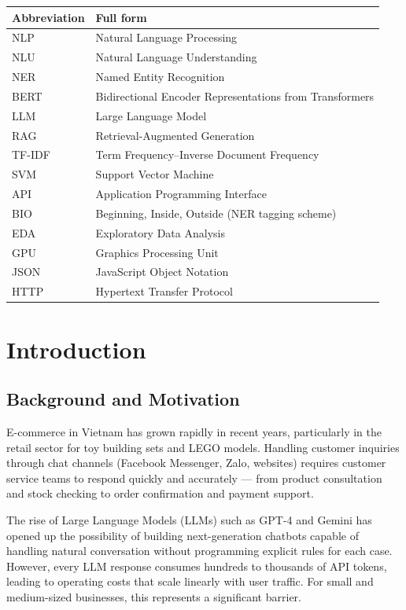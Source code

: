 \documentclass[12pt, a4paper]{report}
\begin{document}
\begin{tabular}{ll}
\toprule
\textbf{Abbreviation} & \textbf{Full form} \\
\midrule
NLP   & Natural Language Processing \\
NLU   & Natural Language Understanding \\
NER   & Named Entity Recognition \\
BERT  & Bidirectional Encoder Representations from Transformers \\
LLM   & Large Language Model \\
RAG   & Retrieval-Augmented Generation \\
TF-IDF & Term Frequency--Inverse Document Frequency \\
SVM   & Support Vector Machine \\
API   & Application Programming Interface \\
BIO   & Beginning, Inside, Outside (NER tagging scheme) \\
EDA   & Exploratory Data Analysis \\
GPU   & Graphics Processing Unit \\
JSON  & JavaScript Object Notation \\
HTTP  & Hypertext Transfer Protocol \\
\bottomrule
\end{tabular}

\chapter{Introduction}

\section{Background and Motivation}

E-commerce in Vietnam has grown rapidly in recent years,
particularly in the retail sector for toy building sets and LEGO models.
Handling customer inquiries through chat channels (Facebook Messenger, Zalo, websites)
requires customer service teams to respond quickly and accurately ---
from product consultation and stock checking to order confirmation and payment support.

The rise of Large Language Models (LLMs) such as GPT-4 and Gemini has opened up
the possibility of building next-generation chatbots capable of handling natural
conversation without programming explicit rules for each case. However,
every LLM response consumes hundreds to thousands of API tokens,
leading to operating costs that scale linearly with user traffic.
For small and medium-sized businesses, this represents a significant barrier.
\end{document}
